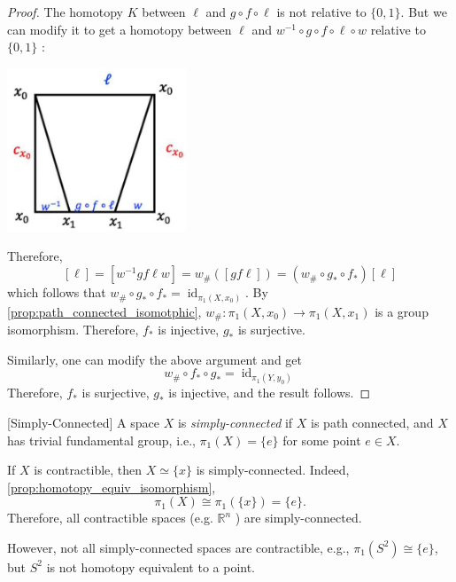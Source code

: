\begin{proof}
The homotopy $K$ between \(\ell\) and \(g \circ  f \circ  \ell\) is not relative to $\{0,1\}$. But we can modify it to get a homotopy between \(\ell\) and \({w}^{-1} \circ  g \circ  f \circ  \ell  \circ  w\) relative to \(\{ 0,1\}\) :
\begin{center}
\includegraphics[width=0.4\textwidth]{images/Ch7_K_homotopy_2.jpg}
\end{center}
Therefore,
\[
\left\lbrack  \ell \right\rbrack   = \left\lbrack  {{w}^{-1}{gf}\ell w}\right\rbrack   = {w}_{\# }\left( \left\lbrack  {{gf}\ell }\right\rbrack  \right)  = \left( {{w}_{\# } \circ  {g}_{ * } \circ  {f}_{ * }}\right) \left\lbrack  \ell \right\rbrack
\]
which follows that \({w}_{\# } \circ  {g}_{ * } \circ  {f}_{ * } = {\operatorname{id}}_{{\pi }_{1}\left( {X,{x}_{0}}\right) }\). By \autoref{prop:path_connected_isomotphic}, ${w}_{\# }: \pi_1(X,x_0) \to \pi_1(X,x_1)$ is a group isomorphism. Therefore, \({f}_{ * }\) is injective, \({g}_{ * }\) is surjective.

Similarly, one can modify the above argument and get
\[
{w}_{\# } \circ  {f}_{ * } \circ  {g}_{ * } = {\operatorname{id}}_{{\pi }_{1}\left( {Y,{y}_{0}}\right) }
\]
Therefore, \({f}_{ * }\) is surjective, \({g}_{ * }\) is injective, and the result follows.
\end{proof}

\begin{definition} \label{def:simply_connected} [Simply-Connected] A space \(X\) is \emph{simply-connected} if \(X\) is path connected, and \(X\) has trivial fundamental group, i.e., \({\pi }_{1}\left( X\right)  = \{ e\}\) for some point \(e \in  X\).
\end{definition}
\begin{example} If \(X\) is contractible, then \(X \simeq  \{ x\}\) is simply-connected. Indeed, \autoref{prop:homotopy_equiv_isomorphism}, 
\[
{\pi }_{1}\left( X\right)  \cong  {\pi }_{1}\left( {\{ x\} }\right)  = \{ e\}.
\]
Therefore, all contractible spaces (e.g. \({\mathbb{R}}^{n}\) ) are simply-connected.
\end{example}

However, not all simply-connected spaces are contractible, e.g., \({\pi }_{1}\left( {S}^{2}\right)  \cong  \{ e\}\), but \({S}^{2}\) is not homotopy equivalent to a point.